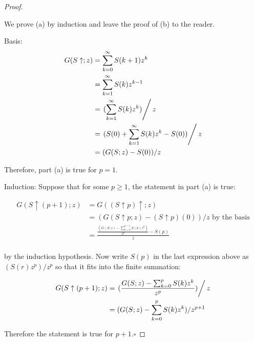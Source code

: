 \documentclass[10pt,]{book}
\theoremstyle{plain}
\theoremstyle{definition}
\theoremstyle{definition}
\theoremstyle{definition}
\theoremstyle{definition}
\numberwithin{equation}{section}
\begin{document}
\begin{proof}\hypertarget{proof-1}{}
We prove (a)  by induction and leave the proof of (b) to the reader.  %
\par
Basis: 
\begin{equation*}
\begin{split}
  G(S\uparrow;z) &= \sum_{k=0}^{\infty} S(k+1) z^k\\
  		& =\sum_{k=1}^{\infty} S(k) z^{k-1}\\
  		& =\left.(\sum_{k=1}^{\infty} S(k) z^k)\right/z\\ 		
  		& =\left.(S(0)+\sum_{k=1}^{\infty} S(k) z^k-S(0))\right/z\\
  		& =(G(S;z)-S(0))/z\\
\end{split}
\end{equation*}

Therefore, part (a) is true for \(p=1\).%
\par
Induction: Suppose that for some \(p\geq 1\), the statement in part (a) is true:

\begin{equation*}
\begin{split}
 G(S\uparrow (p+1);z) &= G((S\uparrow p)\uparrow ;z)\\
		& = (G(S\uparrow p ;z)-(S\uparrow p)(0))/z \textrm{ by the basis}\\
		& = \frac{\frac{(G(S;z)-\sum_{k=0}^{p-1} S(k) z^k)}{z^p}-S(p)}{z}\\
\end{split}
\end{equation*}

by the induction hypothesis. Now write \(S(p)\) in the last expression above as \((S(r)z^p )/z^p\) so that it fits into the finite summation:

\begin{equation*}
\begin{split}
 G(S\uparrow (p+1);z) & =\left.(\frac{G(S;z)-\sum_{k=0}^p S(k) z^k}{z^p})\right/z\\
					& = (G(S;z)-\sum_{k=0}^p S(k) z^k)/z^{p+1}\\
\end{split}
\end{equation*}
%
\par
Therefore the statement is true for \(p+1\).\(\square\)%
\end{proof}
\typeout{************************************************}
\typeout{************************************************}
\end{document}
